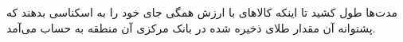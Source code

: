 \documentclass[a4paper,titlepage,12pt,fleqn,oneside]{report}
\begin{document}
	مدت‌ها طول کشید تا اینکه کالاهای با ارزش همگی جای خود را به اسکناسی بدهند که پشتوانه آن مقدار طلای ذخیره شده در بانک مرکزی آن  منطقه به حساب می‌آمد. 
	
\end{document}
